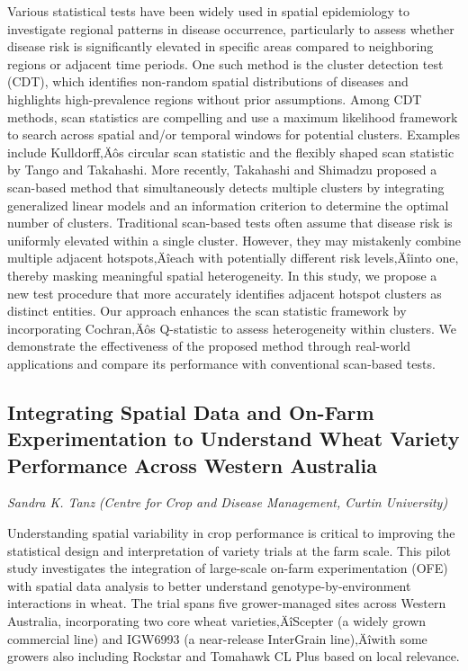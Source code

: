 \documentclass[
]{scrreprt}
\begin{document}
Various statistical tests have been widely used in spatial epidemiology
to investigate regional patterns in disease occurrence, particularly to
assess whether disease risk is significantly elevated in specific areas
compared to neighboring regions or adjacent time periods. One such
method is the cluster detection test (CDT), which identifies non-random
spatial distributions of diseases and highlights high-prevalence regions
without prior assumptions. Among CDT methods, scan statistics are
compelling and use a maximum likelihood framework to search across
spatial and/or temporal windows for potential clusters. Examples include
Kulldorff‚Äôs circular scan statistic and the flexibly shaped scan
statistic by Tango and Takahashi. More recently, Takahashi and Shimadzu
proposed a scan-based method that simultaneously detects multiple
clusters by integrating generalized linear models and an information
criterion to determine the optimal number of clusters. Traditional
scan-based tests often assume that disease risk is uniformly elevated
within a single cluster. However, they may mistakenly combine multiple
adjacent hotspots‚Äîeach with potentially different risk levels‚Äîinto
one, thereby masking meaningful spatial heterogeneity. In this study, we
propose a new test procedure that more accurately identifies adjacent
hotspot clusters as distinct entities. Our approach enhances the scan
statistic framework by incorporating Cochran‚Äôs Q-statistic to assess
heterogeneity within clusters. We demonstrate the effectiveness of the
proposed method through real-world applications and compare its
performance with conventional scan-based tests.

\subsection{Integrating Spatial Data and On-Farm Experimentation to
Understand Wheat Variety Performance Across Western
Australia}\label{integrating-spatial-data-and-on-farm-experimentation-to-understand-wheat-variety-performance-across-western-australia}

\emph{Sandra K. Tanz} \emph{(Centre for Crop and
Disease Management, Curtin University)}

\setlength{\parskip}{0.5em}

Understanding spatial variability in crop performance is critical to
improving the statistical design and interpretation of variety trials at
the farm scale. This pilot study investigates the integration of
large-scale on-farm experimentation (OFE) with spatial data analysis to
better understand genotype-by-environment interactions in wheat. The
trial spans five grower-managed sites across Western Australia,
incorporating two core wheat varieties‚ÄîScepter (a widely grown
commercial line) and IGW6993 (a near-release InterGrain line)‚Äîwith
some growers also including Rockstar and Tomahawk CL Plus based on local
relevance.
\end{document}
